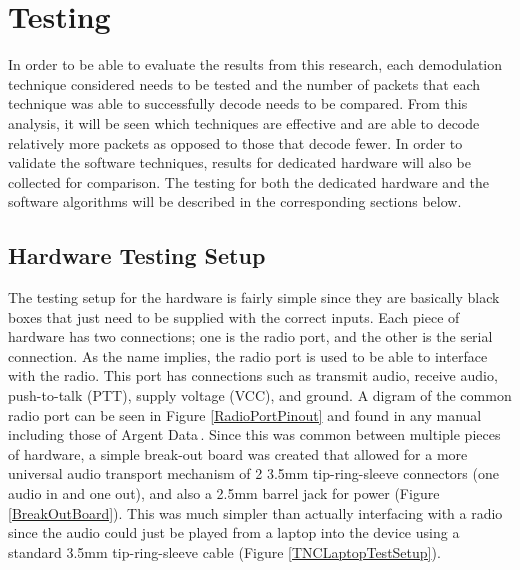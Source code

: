 \chapter{Testing}
In order to be able to evaluate the results from this research, each demodulation technique considered needs to be tested and the number of packets that each technique was able to successfully decode needs to be compared. From this analysis, it will be seen which techniques are effective and are able to decode relatively more packets as opposed to those that decode fewer. In order to validate the software techniques, results for dedicated hardware will also be collected for comparison. The testing for both the dedicated hardware and the software algorithms will be described in the corresponding sections below.

\section{Hardware Testing Setup}
The testing setup for the hardware is fairly simple since they are basically black boxes that just need to be supplied with the correct inputs. Each piece of hardware has two connections; one is the radio port, and the other is the serial connection. As the name implies, the radio port is used to be able to interface with the radio. This port has connections such as transmit audio, receive audio, push-to-talk (PTT), supply voltage (VCC), and ground. A digram of the common radio port can be seen in Figure \ref{RadioPortPinout} and found in any manual including those of Argent Data\,\cite{Systems2013}. Since this was common between multiple pieces of hardware, a simple break-out board was created that allowed for a more universal audio transport mechanism of 2 3.5mm tip-ring-sleeve connectors (one audio in and one out), and also a 2.5mm barrel jack for power (Figure \ref{BreakOutBoard}). This was much simpler than actually interfacing with a radio since the audio could just be played from a laptop into the device using a standard 3.5mm tip-ring-sleeve cable (Figure \ref{TNCLaptopTestSetup}). 

